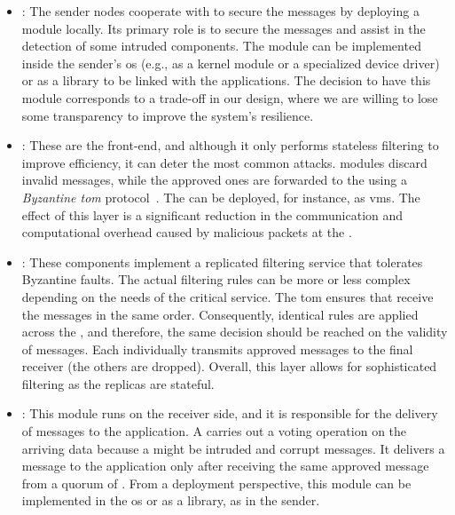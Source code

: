 \begin{itemize}


\item \sender: The sender nodes cooperate with \sieveq to secure the messages by deploying a \sender module locally. 
Its primary role is to secure the messages and assist in the detection of some intruded \sieveq components. 
The module can be implemented inside the sender's \gls{os} (e.g., as a kernel module or a specialized device driver) or as a library to be linked with the applications.
The decision to have this module corresponds to a trade-off in our design, where we are willing to lose some transparency to improve the system's resilience.

\item \presieve: These are the \sieveq front-end, and although it only performs stateless filtering to improve efficiency, it can deter the most common attacks. 
\Presieve modules discard invalid messages, while the approved ones are forwarded to the \repsieve using a \emph{Byzantine \gls{tom}} protocol~\cite{Bessani:2014}. 
The \presieves can be deployed, for instance, as \glspl{vm}. 
The effect of this layer is a significant reduction in the communication and computational overhead caused by malicious packets at the \repsieve.

\item \repsieve: These components implement a replicated filtering service that tolerates Byzantine faults. 
The actual filtering rules can be more or less complex depending on the needs of the critical service. 
The \gls{tom} ensures that \repsieves receive the messages in the same order. 
Consequently, identical rules are applied across the \repsieves, and therefore, the same decision should be reached on the validity of messages. 
Each \repsieve individually transmits approved messages to the final receiver (the others are dropped). 
Overall, this layer allows for sophisticated filtering as the replicas are stateful.

\item \postsieve: This module runs on the receiver side, and it is responsible for the delivery of messages to the application.
A \postsieve carries out a voting operation on the arriving data because a \repsieve might be intruded and corrupt messages.
It delivers a message to the application only after receiving the same approved message from a quorum of \repsieves.
From a deployment perspective, this module can be implemented in the \gls{os} or as a library, as in the sender.


\end{itemize}
